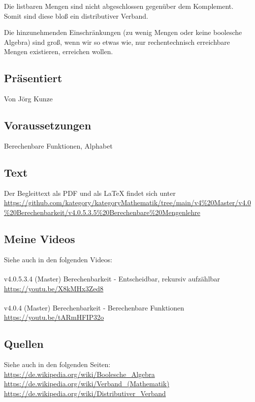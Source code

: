 \documentclass[a4paper]{amsart}
\theoremstyle{definition}
\begin{document}
Die listbaren Mengen sind nicht abgeschlossen gegenüber dem Komplement. Somit sind diese bloß ein distributiver Verband. 

Die hinzunehmenden Einschränkungen (zu wenig Mengen oder keine boolesche Algebra) sind groß, wenn wir so etwas wie, nur rechentechnisch erreichbare Mengen existieren, erreichen wollen. 

\subsection*{Präsentiert}
Von Jörg Kunze

\subsection*{Voraussetzungen}
Berechenbare Funktionen, Alphabet

\subsection*{Text}
Der Begleittext als PDF und als LaTeX findet sich unter
{\tiny
   \url{https://github.com/kategory/kategoryMathematik/tree/main/v4%20Master/v4.0%20Berechenbarkeit/v4.0.5.3.5%20Berechenbare%20Mengenlehre}
}

\subsection*{Meine Videos}
Siehe auch in den folgenden Videos:\\
\\
v4.0.5.3.4 (Master) Berechenbarkeit - Entscheidbar, rekursiv aufzählbar\\
\url{https://youtu.be/X8kMHx3Zed8}\\
\\
v4.0.4 (Master) Berechenbarkeit - Berechenbare Funktionen\\
\url{https://youtu.be/tARmHFIP32o}

\subsection*{Quellen}
Siehe auch in den folgenden Seiten:\\
\url{https://de.wikipedia.org/wiki/Boolesche_Algebra}\\
\url{https://de.wikipedia.org/wiki/Verband_(Mathematik)}\\
\url{https://de.wikipedia.org/wiki/Distributiver_Verband}
\end{document}
